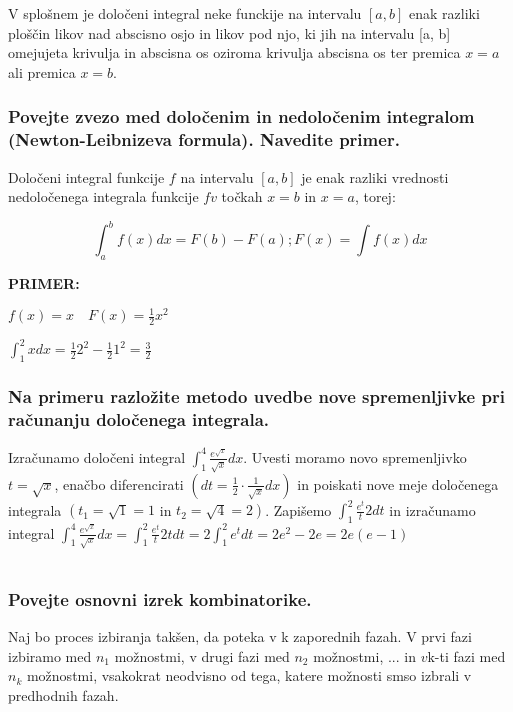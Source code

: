 \documentclass{article}
\begin{document}
V splošnem je določeni integral neke funckije na intervalu $[a, b]$ enak razliki ploščin likov nad abscisno osjo in likov pod njo, ki jih na intervalu [a, b] omejujeta krivulja in abscisna os oziroma krivulja abscisna os ter premica $x=a$ ali premica $x=b$.

\subsubsection*{Povejte zvezo med določenim in nedoločenim integralom (Newton-Leibnizeva formula). Navedite primer.}

Določeni integral funkcije $f$ na intervalu $[a, b]$ je enak razliki vrednosti nedoločenega integrala funkcije $f v$ točkah $x=b$ in $x=a$, torej:

$$\int_{a}^{b} f(x) d x=F(b)-F(a) ; F(x)=\int f(x) d x$$

\textbf{PRIMER:}

$f(x)=x \quad F(x)=\frac{1}{2} x^{2}$

$\int_{1}^{2} x d x=\frac{1}{2} 2^{2}-\frac{1}{2} 1^{2}=\frac{3}{2}$

\subsubsection*{Na primeru razložite metodo uvedbe nove spremenljivke pri računanju določenega integrala.}

Izračunamo določeni integral $\int_{1}^{4} \frac{e^{\sqrt{x}}}{\sqrt{x}} d x$. Uvesti moramo novo spremenljivko $t=\sqrt{x}$, enačbo diferencirati $\left(d t=\frac{1}{2} \cdot \frac{1}{\sqrt{x}} d x\right)$ in poiskati nove meje določenega integrala $\left(t_{1}=\sqrt{1}=1\right.$ in $\left.t_{2}=\sqrt{4}=2\right)$. Zapišemo $\int_{1}^{2} \frac{e^{t}}{t} 2 d t$ in izračunamo integral $\int_{1}^{4} \frac{e^{\sqrt{x}}}{\sqrt{x}} d x=\int_{1}^{2} \frac{e^{t}}{t} 2 t d t=2 \int_{1}^{2} e^{t} d t=2 e^{2}-2 e=2 e(e-1)$

\section{\texorpdfstring{}{Kombinatorika}}
\subsubsection*{Povejte osnovni izrek kombinatorike.}

Naj bo proces izbiranja takšen, da poteka v k zaporednih fazah. V prvi fazi izbiramo med $n_{1}$ možnostmi, v drugi fazi med $n_{2}$ možnostmi, ... in $v \mathrm{k}$-ti fazi med $n_{k}$ možnostmi, vsakokrat neodvisno od tega, katere možnosti smso izbrali v predhodnih fazah.
\end{document}
